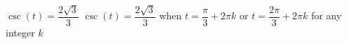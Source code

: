 {$\csc(t) = \dfrac{2\sqrt{3}}{3}$}
{$\csc(t) = \dfrac{2\sqrt{3}}{3}$ when $t = \dfrac{\pi}{3} + 2\pi k$ or $t = \dfrac{2\pi}{3} + 2\pi k$ for any integer $k$}
